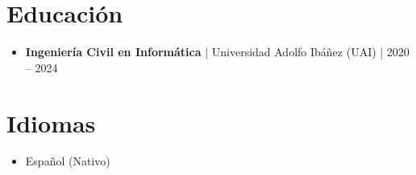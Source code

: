 \documentclass[a4paper, 10pt]{article}
\begin{document}
\vspace{0.3cm}

\section*{Educación}
\begin{itemize}[noitemsep, leftmargin=*]
    \item \textbf{Ingeniería Civil en Informática} | Universidad Adolfo Ibáñez (UAI) | 2020 -- 2024
\end{itemize}

\vspace{0.3cm}

\section*{Idiomas}
\begin{itemize}[noitemsep, leftmargin=*]
    \item Español (Nativo)
\end{itemize}
\end{document}
